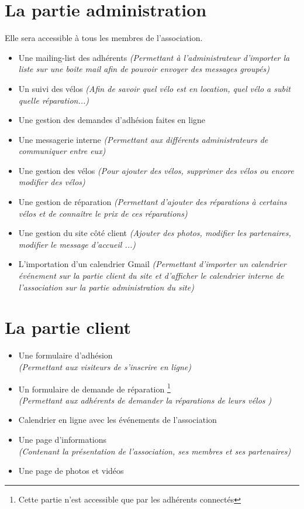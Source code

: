 \documentclass[11pt,a4paper,titlepage]{report}
\begin{document}
\section{La partie administration} 
Elle sera accessible à tous les membres de l'association.\\
\begin{itemize}
\item Une mailing-list des adhérents 
\textit{(Permettant à l'administrateur d'importer la liste sur une boite mail afin de pouvoir envoyer des messages groupés)}
\item Un suivi des vélos 
\textit{(Afin de savoir quel vélo est en location, quel vélo a subit quelle réparation...)}
\item Une gestion des demandes d'adhésion faites en ligne
\item Une messagerie interne 
\textit{(Permettant aux différents administrateurs de communiquer entre eux)}
\item Une gestion des vélos 
\textit{(Pour ajouter des vélos, supprimer des vélos ou encore modifier des vélos)}
\item Une gestion de réparation 
\textit{(Permettant d'ajouter des réparations à certains vélos et de connaître le prix de ces réparations)}
\item Une gestion du site côté client 
\textit{(Ajouter des photos, modifier les partenaires, modifier le message d'accueil ...)}
\item L'importation d'un calendrier Gmail 
\textit{(Permettant d'importer un calendrier événement sur la partie client du site et d'afficher le calendrier interne de l'association sur la partie administration du site)}
\end{itemize}

  
  
\section{La partie client}

\begin{itemize}
\item Une formulaire d'adhésion \\
\textit{(Permettant aux visiteurs de s'inscrire en ligne)}
\item Un formulaire de demande de réparation \footnote{Cette partie n'est accessible que par les adhérents connectés}  \\
\textit{(Permettant aux adhérents de demander la réparations de leurs vélos )}
\item Calendrier en ligne avec les événements de l'association 
\item Une page d'informations  \\
\textit{(Contenant la présentation de l'association, ses membres et ses partenaires)} 
\item Une page de photos et vidéos  

\end{itemize}
\end{document}
